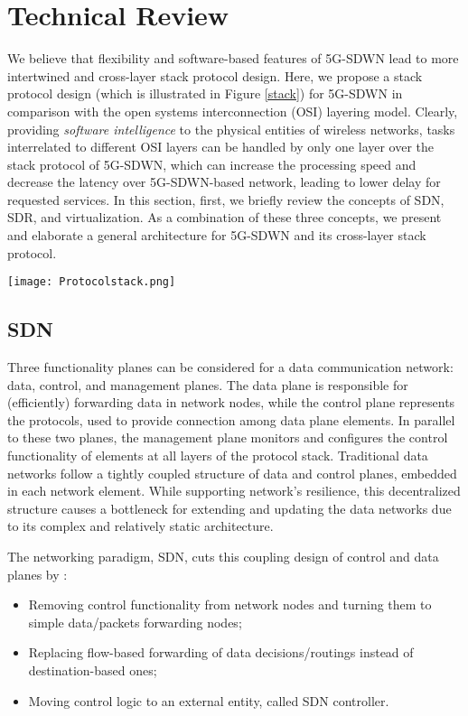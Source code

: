 \documentclass[conference]{IEEEtran}
\begin{document}
\section{Technical Review}
We believe that flexibility and software-based features of 5G-SDWN lead to more intertwined and cross-layer stack protocol design. Here, we propose a stack protocol design (which is illustrated in Figure \ref{stack}) for 5G-SDWN in comparison with the open systems interconnection (OSI) layering model. Clearly, providing \textit{software intelligence} to the physical entities of wireless networks, tasks interrelated to different OSI layers can be handled by only one layer over the stack protocol of 5G-SDWN, which can increase the processing speed and decrease the latency over 5G-SDWN-based network, leading to lower delay for requested services.    
In this section, first, we briefly review the concepts of SDN, SDR, and virtualization. As a combination of these three concepts, we present and elaborate a general architecture for 5G-SDWN and its cross-layer stack protocol. 

\begin{figure*}[!t]
	\centering
	\texttt{[image: Protocolstack.png]}
	\caption{Stack protocol of 5G-SDWN compared to OSI model.}
\label{stack}
\end{figure*}
\subsection{SDN}\label{Sec:SDN}
Three functionality planes can be considered for a data communication network: data, control, and management planes. The data plane is responsible for (efficiently) forwarding data in network nodes, while the control plane represents the protocols, used to provide connection among data plane elements. In parallel to these two planes, the management plane monitors and configures the control functionality of elements at all layers of the protocol stack. Traditional data networks follow a tightly coupled structure of data and control planes, embedded in each network element. While supporting network's resilience, this decentralized structure causes a bottleneck for extending and updating the data networks due to its complex and relatively static architecture.

The networking paradigm, SDN, cuts this coupling design of control and data planes by \cite{7039225}: 
\begin{itemize}
	\item Removing control functionality from network nodes and turning them to simple data/packets forwarding nodes;
	\item Replacing flow-based forwarding of data decisions/routings instead of destination-based ones;
	\item Moving control logic to an external entity, called SDN controller.  
\end{itemize} 
\end{document}
